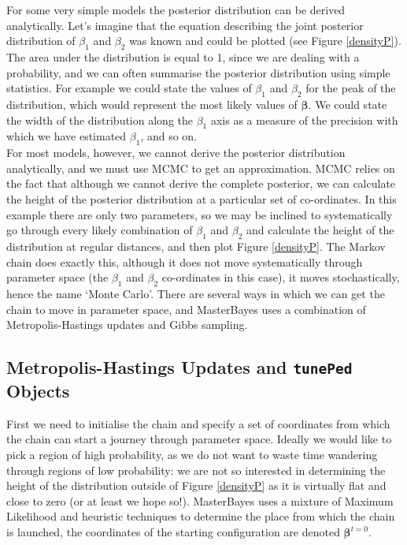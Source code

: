 \documentclass{article}
\begin{document}
For some very simple models the posterior distribution can be derived analytically. Let's imagine that the equation describing the joint posterior distribution of $\beta_{1}$ and $\beta_{2}$ was known and could be plotted (see Figure \ref{densityP}).  The area under the distribution is equal to 1, since we are dealing with a probability, and we can often summarise the posterior distribution using simple statistics.  For example we could state the values of $\beta_{1}$ and $\beta_{2}$ for the peak of the distribution, which would represent the most likely values of $\bm{\beta}$.  We could state the width of the distribution along the $\beta_{1}$ axis as a measure of the precision with which we have estimated $\beta_{1}$, and so on.\\

For most models, however, we cannot derive the posterior distribution analytically, and we must use MCMC to get an approximation.  MCMC relies on the fact that although we cannot derive the complete posterior, we can calculate the height of the posterior distribution at a particular set of co-ordinates. In this example there are only two parameters, so we may be inclined to systematically go through every likely combination of $\beta_{1}$ and $\beta_{2}$ and calculate the height of the distribution at regular distances, and then plot Figure \ref{densityP}.  The Markov chain does exactly this, although it does not move systematically through parameter space (the $\beta_{1}$ and $\beta_{2}$ co-ordinates in this case), it moves stochastically, hence the name `Monte Carlo'.  There are several ways in which we can get the chain to move in parameter space, and MasterBayes uses a combination of Metropolis-Hastings updates and Gibbs sampling.\\   

\subsection{Metropolis-Hastings Updates and \texttt{tunePed} Objects}

First we need to initialise the chain and specify a set of coordinates from which the chain can start a journey through parameter space. Ideally we would like to pick a region of high probability, as we do not want to waste time wandering through regions of low probability: we are not so interested in determining the height of the distribution outside of  Figure \ref{densityP} as it is virtually flat and close to zero (or at least we hope so!).  MasterBayes uses a mixture of Maximum Likelihood and heuristic techniques to determine the place from which the chain is launched, the coordinates of the starting configuration are denoted $\bm{\beta}^{t=0}$.\\
\end{document}
